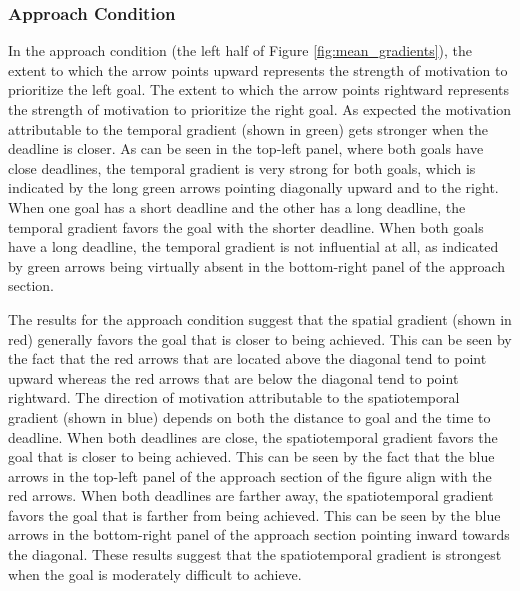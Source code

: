 \documentclass[a4paper,doc,natbib,donotrepeattitle]{apa6}
\begin{document}
\subsubsection{Approach Condition}
In the approach condition (the left half of Figure \ref{fig:mean_gradients}),
the extent to which the arrow points upward represents the strength of motivation to prioritize the left goal. The extent to which the arrow points rightward represents the strength of motivation to prioritize the right goal.
As expected the motivation attributable to the temporal gradient (shown in green) gets stronger when the deadline is closer. As can be seen in the top-left panel, where both goals have close deadlines, the temporal gradient is very strong for both goals, which is indicated by the long green arrows pointing diagonally upward and to the right. When one goal has a short deadline and the other has a long deadline, the temporal gradient favors the goal with the shorter deadline. When both goals have a long deadline, the temporal gradient is not influential at all, as indicated by green arrows being virtually absent in the bottom-right panel of the approach section.

The results for the approach condition suggest that the spatial gradient (shown in red) generally favors the goal that is closer to being achieved. This can be seen by the fact that the red arrows that are located above the diagonal tend to point upward whereas the red arrows that are below the diagonal tend to point rightward. The direction of motivation attributable to the spatiotemporal gradient (shown in blue) depends on both the distance to goal and the time to deadline. When both deadlines are close, the spatiotemporal gradient favors the goal that is closer to being achieved. This can be seen by the fact that the blue arrows in the top-left panel of the approach section of the figure align with the red arrows. When both deadlines are farther away, the spatiotemporal gradient favors the goal that is farther from being achieved. This can be seen by the blue arrows in the bottom-right panel of the approach section pointing inward towards the diagonal. These results suggest that the spatiotemporal gradient is strongest when the goal is moderately difficult to achieve.
\end{document}
